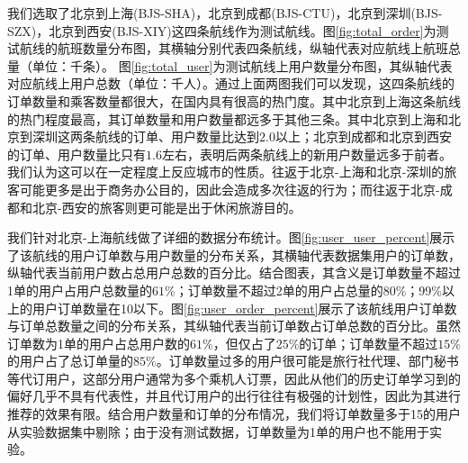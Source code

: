 \begin{figure}
\centering
{}
\end{figure}

我们选取了北京到上海(BJS-SHA)，北京到成都(BJS-CTU)，北京到深圳(BJS-SZX)，北京到西安(BJS-XIY)这四条航线作为测试航线。图\ref{fig:total_order}为测试航线的航班数量分布图，其横轴分别代表四条航线，纵轴代表对应航线上航班总量（单位：千条）。
图\ref{fig:total_user}为测试航线上用户数量分布图，其纵轴代表对应航线上用户总数（单位：千人）。通过上面两图我们可以发现，这四条航线的订单数量和乘客数量都很大，在国内具有很高的热门度。其中北京到上海这条航线的热门程度最高，其订单数量和用户数量都远多于其他三条。其中北京到上海和北京到深圳这两条航线的订单、用户数量比达到$2.0$以上；北京到成都和北京到西安的订单、用户数量比只有$1.6$左右，表明后两条航线上的新用户数量远多于前者。我们认为这可以在一定程度上反应城市的性质。往返于北京-上海和北京-深圳的旅客可能更多是出于商务办公目的，因此会造成多次往返的行为；而往返于北京-成都和北京-西安的旅客则更可能是出于休闲旅游目的。

\begin{figure}
\centering
{}
\end{figure}

我们针对北京-上海航线做了详细的数据分布统计。图\ref{fig:user_user_percent}展示了该航线的用户订单数与用户数量的分布关系，其横轴代表数据集用户的订单数，纵轴代表当前用户数占总用户总数的百分比。结合图表，其含义是订单数量不超过1单的用户占用户总数量的$61\%$；订单数量不超过2单的用户占总量的80\%；99\%以上的用户订单数量在10以下。图\ref{fig:user_order_percent}展示了该航线用户订单数与订单总数量之间的分布关系，其纵轴代表当前订单数占订单总数的百分比。虽然订单数为1单的用户占总用户数的$61\%$，但仅占了$25\%$的订单；订单数量不超过$15\%$的用户占了总订单量的$85\%$。订单数量过多的用户很可能是旅行社代理、部门秘书等代订用户，这部分用户通常为多个乘机人订票，因此从他们的历史订单学习到的偏好几乎不具有代表性，并且代订用户的出行往往有极强的计划性，因此为其进行推荐的效果有限。结合用户数量和订单的分布情况，我们将订单数量多于15的用户从实验数据集中剔除；由于没有测试数据，订单数量为1单的用户也不能用于实验。

